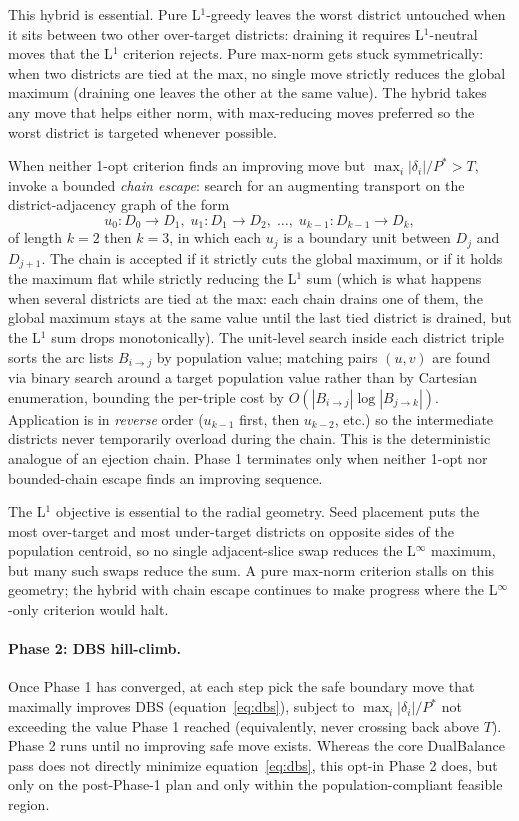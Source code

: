 This hybrid is essential. Pure L$^1$-greedy leaves the worst district
untouched when it sits between two other over-target districts:
draining it requires L$^1$-neutral moves that the L$^1$ criterion
rejects. Pure max-norm gets stuck symmetrically: when two districts
are tied at the max, no single move strictly reduces the global
maximum (draining one leaves the other at the same value). The
hybrid takes any move that helps either norm, with max-reducing moves
preferred so the worst district is targeted whenever possible.

When neither 1-opt criterion finds an improving move but
$\max_i |\delta_i|/P^{*} > T$, invoke a bounded \emph{chain escape}:
search for an augmenting transport on the district-adjacency graph
of the form
\[
  u_0 : D_0 \to D_1,\; u_1 : D_1 \to D_2,\; \ldots,\; u_{k-1} : D_{k-1} \to D_k,
\]
of length $k = 2$ then $k = 3$, in which each $u_j$ is a boundary unit
between $D_j$ and $D_{j+1}$. The chain is accepted if it strictly
cuts the global maximum, or if it holds the maximum flat while
strictly reducing the L$^1$ sum (which is what happens when several
districts are tied at the max: each chain drains one of them, the
global maximum stays at the same value until the last tied district
is drained, but the L$^1$ sum drops monotonically). The unit-level
search inside each district triple sorts the arc lists $B_{i \to j}$
by population value; matching pairs $(u, v)$ are found via binary
search around a target population value rather than by Cartesian
enumeration, bounding the per-triple cost by
$O(|B_{i \to j}| \log |B_{j \to k}|)$. Application is in
\emph{reverse} order ($u_{k-1}$ first, then $u_{k-2}$, etc.) so the
intermediate districts never temporarily overload during the chain.
This is the deterministic analogue of an ejection chain. Phase 1
terminates only when neither 1-opt nor bounded-chain escape finds an
improving sequence.

The L$^1$ objective is essential to the radial geometry. Seed
placement puts the most over-target and most under-target districts
on opposite sides of the population centroid, so no single
adjacent-slice swap reduces the L$^\infty$ maximum, but many such
swaps reduce the sum. A pure max-norm criterion stalls on this
geometry; the hybrid with chain escape continues to make progress
where the L$^\infty$-only criterion would halt.

\paragraph{Phase 2: DBS hill-climb.}
Once Phase 1 has converged, at each step pick the safe boundary move
that maximally improves $\mathrm{DBS}$ (equation~\ref{eq:dbs}), subject
to $\max_i |\delta_i|/P^{*}$ not exceeding the value Phase 1 reached
(equivalently, never crossing back above $T$). Phase 2 runs until no
improving safe move exists. Whereas the core DualBalance pass does not
directly minimize equation~\ref{eq:dbs}, this opt-in Phase 2 does, but
only on the post-Phase-1 plan and only within the population-compliant
feasible region.

